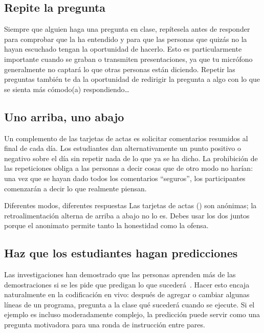 \subsection*{Repite la pregunta}

Siempre que alguien haga una pregunta en clase,
repítesela antes de responder
para comprobar que la ha entendido
y para que las personas que quizás no la hayan escuchado tengan la oportunidad de hacerlo.
Esto es particularmente importante cuando se graban o transmiten presentaciones,
ya que tu micrófono generalmente no captará lo que otras personas están diciendo. Repetir las preguntas también te da la oportunidad
de redirigir la pregunta a algo con lo que se sienta más cómodo(a) respondiendo{\ldots}

\subsection*{Uno arriba, uno abajo}

Un complemento de las tarjetas de actas es solicitar comentarios resumidos al final de cada día.
Los estudiantes dan alternativamente un punto positivo o negativo sobre el día
sin repetir nada de lo que ya se ha dicho.
La prohibición de las repeticiones obliga a las personas a decir cosas que de otro modo no harían:
una vez que se hayan dado todos los comentarios ``seguros'',
los participantes comenzarán a decir lo que realmente piensan.

\begin{aside}{Diferentes modos, diferentes respuestas}
  Las tarjetas de actas () son anónimas;
  la retroalimentación alterna de arriba a abajo no lo es.
  Debes usar los dos juntos
  porque el anonimato permite tanto la honestidad como la ofensa.
\end{aside}

\subsection*{Haz que los estudiantes hagan predicciones}

Las investigaciones han demostrado que las personas aprenden más de las demostraciones
si se les pide que predigan lo que sucederá~\cite{Mill2013}.
Hacer esto encaja naturalmente en la codificación en vivo:
después de agregar o cambiar algunas líneas de un programa,
pregunta a la clase qué sucederá cuando se ejecute.
Si el ejemplo es incluso moderadamente complejo,
la predicción puede servir como una pregunta motivadora para una ronda de instrucción entre pares.

